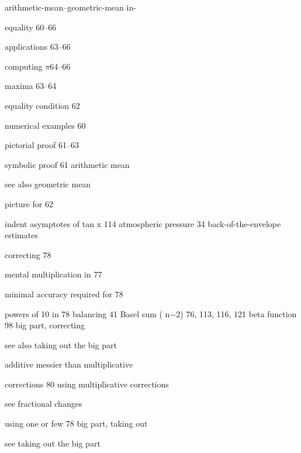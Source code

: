 \documentclass[b5paper]{article}
\begin{document}
\begin{multicols}{2}
arithmetic-mean–geometric-mean in-\par equality
60–66\par
applications 63–66\par
computing $\pi$64–66\par\quad
maxima 63–64\par\quad
equality condition 62\par
numerical examples 60\par
pictorial proof 61–63\par
symbolic proof 61\quad \quad
arithmetic mean\par
see also geometric mean\par
picture for 62\par indent\quad
asymptotes of tan x 114\quad
atmospheric pressure 34\quad
back-of-the-envelope estimates\par
correcting 78\par
mental multiplication in 77\par
minimal accuracy required for 78\par
powers of 10 in 78\quad
balancing 41\quad
Basel sum (\quad
n−2) 76, 113, 116, 121\quad
beta function 98\quad
big part, correcting \par
see also taking out the big part\par
additive messier than multiplicative\par
corrections 80\quad
using multiplicative corrections\par
see fractional changes\par
using one or few 78\quad
big part, taking out\par
see taking out the big part\par
\end{multicols}
\end{document}
